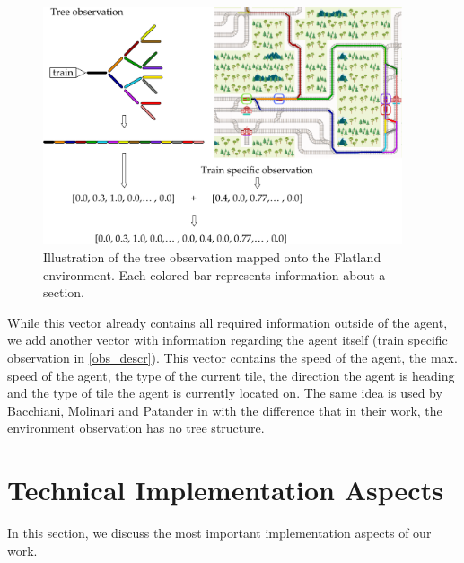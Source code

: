 \begin{figure}[H]
	\centering
	\includegraphics[width=300pt]{diagrams/tree_obs_mapping.pdf}
	\caption{Illustration of the tree observation mapped onto the Flatland environment. Each colored bar represents information about a section.}
	\label{fig:obs_descr}
\end{figure}
While this vector already contains all required information outside of the agent, we add another vector with information regarding the agent itself (train specific observation in \autoref{obs_descr}). This vector contains the speed of the agent, the max. speed of the agent, the type of the current tile, the direction the agent is heading and the type of tile the agent is currently located on. The same idea is used by Bacchiani, Molinari and Patander in \cite{marltraffica3c} with the difference that in their work, the environment observation has no tree structure.
\newpage
\section{Technical Implementation Aspects}\label{software}
In this section, we discuss the most important implementation aspects of our work.
